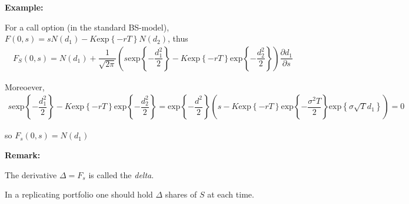 \noindent\textbf{Example:}\par
\noindent For a call option (in the standard BS-model), $F(0,s) = sN(d_1) - K\text{exp}\left\{-rT\right\}N(d_2)$, thus
\begin{equation*}
  \begin{gathered}
    F_S(0,s) = N(d_1)+\dfrac{1}{\sqrt{2\pi}}\left(s\text{exp}\left\{-\dfrac{d_1^2}{2}\right\}-K\text{exp}\left\{-rT\right\}\text{exp}\left\{-\dfrac{d_2^2}{2}\right\}\right)\dfrac{\partial d_1}{\partial s}
  \end{gathered}
\end{equation*}
\par\bigskip
\noindent Moreoever, 
\begin{equation*}
  \begin{gathered}
    s\text{exp}\left\{-\dfrac{d_1^2}{2}\right\}-K\text{exp}\left\{-rT\right\}\text{exp}\left\{-\dfrac{d_2^2}{2}\right\} = \text{exp}\left\{-\dfrac{d^2}{2}\right\}\left(s-K\text{exp}\left\{-rT\right\}\text{exp}\left\{-\dfrac{\sigma^2T}{2}\right\}\text{exp}\left\{\sigma\sqrt{T}d_1\right\}\right) = 0
  \end{gathered}
\end{equation*}\par
\noindent so $F_s(0,s) = N(d_1)$
\par\bigskip
\noindent\textbf{Remark:}\par
\noindent The derivative $\Delta = F_s$ is called the \textit{delta}.\par
\noindent In a replicating portfolio one should hold $\Delta$ shares of $S$ at each time.
